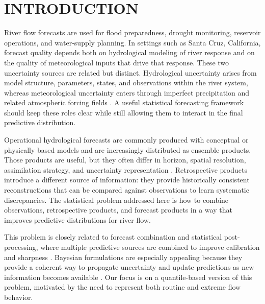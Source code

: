 \documentclass[APA,STIX1COL]{WileyNJD-v2}
\begin{document}


\section{INTRODUCTION}

River flow forecasts are used for flood preparedness, drought monitoring, reservoir operations, and water-supply planning. In settings such as Santa Cruz, California, forecast quality depends both on hydrological modeling of river response and on the quality of meteorological inputs that drive that response. These two uncertainty sources are related but distinct. Hydrological uncertainty arises from model structure, parameters, states, and observations within the river system, whereas meteorological uncertainty enters through imperfect precipitation and related atmospheric forcing fields \citep{tarek2021daily, thiboult2016accounting, kim2019hybrid, haiden2021evaluation}. A useful statistical forecasting framework should keep these roles clear while still allowing them to interact in the final predictive distribution.

Operational hydrological forecasts are commonly produced with conceptual or physically based models and are increasingly distributed as ensemble products. Those products are useful, but they often differ in horizon, spatial resolution, assimilation strategy, and uncertainty representation \citep{molteni1996ecmwf, isaksen2010ensemble, demargne2013science, barlage2021importance, johnson2023comprehensive}. Retrospective products introduce a different source of information: they provide historically consistent reconstructions that can be compared against observations to learn systematic discrepancies. The statistical problem addressed here is how to combine observations, retrospective products, and forecast products in a way that improves predictive distributions for river flow.

This problem is closely related to forecast combination and statistical post-processing, where multiple predictive sources are combined to improve calibration and sharpness \citep{siegert2019forecast, vannitsem, wang2022forecastcombinations50yearreview}. Bayesian formulations are especially appealing because they provide a coherent way to propagate uncertainty and update predictions as new information becomes available \citep{duan2006bma, yumnam2022quantile, aastveit2022quantifying, du2018ensemble_forecasting, doubleday, kleiber2011geostatistical, mcalinn2019dynamic, tallman2023bayesianpredictivedecisionsynthesis, johnson2023bayesian}. Our focus is on a quantile-based version of this problem, motivated by the need to represent both routine and extreme flow behavior.
\end{document}
